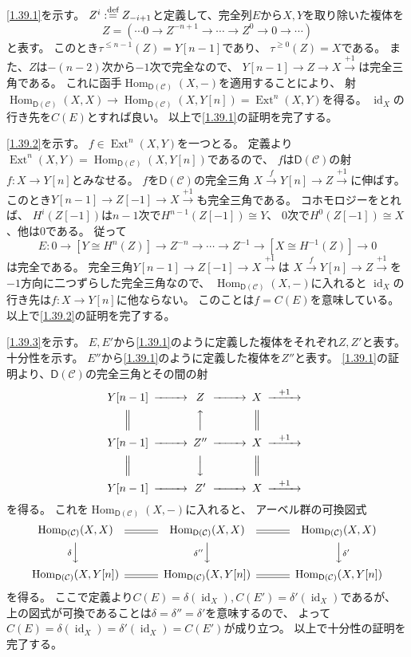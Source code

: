 \documentclass[uplatex,dvipdfmx]{jsarticle}
\makeatletter
\theoremstyle{definition}
\renewenvironment{proof}[1][\proofname]{
  \pushQED{\qed}%
  \normalfont \topsep6\p@\@plus6\p@\relax
  \trivlist
  \item[\hskip\labelsep
    #1\@addpunct{\textbf{.}}]\ignorespaces
}{%
  \popQED\endtrivlist\@endpefalse
}
\providecommand{\proofname}{証明}
\DeclareMathOperator{\Hom}{\mathrm{Hom}}
\DeclareMathOperator{\id}{\mathrm{id}}
\DeclareMathOperator{\Ext}{\mathrm{Ext}}
\newcommand{\sfD}{\mathsf{D}}
\newcommand\mcC{\mathcal{C}}
\def\dfn{:\overset{\mbox{{\scriptsize def}}}{=}}
\makeatother
\begin{document}
\begin{proof}
  \ref{1.39.1}を示す。
  \(Z^i \dfn Z_{-i+1}\)と定義して、完全列\(E\)から\(X,Y\)を取り除いた複体を
  \[Z = (\cdots 0\to Z^{-n+1} \to \cdots \to Z^0\to 0 \to \cdots)\]
  と表す。
  このとき\(\tau^{\leq n-1}(Z) = Y[n-1]\)であり、
  \(\tau^{\geq 0}(Z) = X\)である。
  また、\(Z\)は\(-(n-2)\)次から\(-1\)次で完全なので、
  \(Y[n-1]\to Z\to X\xrightarrow{+1}\)は完全三角である。
  これに函手\(\Hom_{\sfD(\mcC)}(X,-)\)を適用することにより、
  射\(\Hom_{\sfD(\mcC)}(X,X)\to \Hom_{\sfD(\mcC)}(X,Y[n]) = \Ext^n(X,Y)\)を得る。
  \(\id_X\)の行き先を\(C(E)\)とすれば良い。
  以上で\ref{1.39.1}の証明を完了する。

  \ref{1.39.2}を示す。
  \(f\in \Ext^n(X,Y)\)を一つとる。
  定義より\(\Ext^n(X,Y) = \Hom_{\sfD(\mcC)}(X,Y[n])\)であるので、
  \(f\)は\(\sfD(\mcC)\)の射\(f:X\to Y[n]\)とみなせる。
  \(f\)を\(\sfD(\mcC)\)の完全三角
  \(X\xrightarrow{f} Y[n]\to Z\xrightarrow{+1}\)に伸ばす。
  このとき\(Y[n-1]\to Z[-1]\to X\xrightarrow{+1}\)も完全三角である。
  コホモロジーをとれば、
  \(H^i(Z[-1])\)は\(n-1\)次で\(H^{n-1}(Z[-1])\cong Y\)、
  \(0\)次で\(H^0(Z[-1])\cong X\)、他は\(0\)である。
  従って
  \[E : 0\to [Y\cong H^n(Z)]\to Z^{-n} \to \cdots \to Z^{-1} \to [X\cong H^{-1}(Z)]\to 0\]
  は完全である。
  完全三角\(Y[n-1]\to Z[-1]\to X\xrightarrow{+1}\)は
  \(X\xrightarrow{f} Y[n]\to Z\xrightarrow{+1}\)を
  \(-1\)方向に二つずらした完全三角なので、
  \(\Hom_{\sfD(\mcC)}(X,-)\)に入れると
  \(\id_X\)の行き先は\(f:X\to Y[n]\)に他ならない。
  このことは\(f = C(E)\)を意味している。
  以上で\ref{1.39.2}の証明を完了する。

  \ref{1.39.3}を示す。
  \(E,E'\)から\ref{1.39.1}のように定義した複体をそれぞれ\(Z,Z'\)と表す。
  十分性を示す。
  \(E''\)から\ref{1.39.1}のように定義した複体を\(Z''\)と表す。
  \ref{1.39.1}の証明より、\(\sfD(\mcC)\)の完全三角とその間の射
  \[
  \begin{CD}
    Y[n-1] @>>> Z @>>> X @> +1 >> \\
    @| @AAA @| @. \\
    Y[n-1] @>>> Z'' @>>> X @> +1 >> \\
    @| @VVV @| @. \\
    Y[n-1] @>>> Z' @>>> X @> +1 >>
  \end{CD}
  \]
  を得る。
  これを\(\Hom_{\sfD(\mcC)}(X,-)\)に入れると、
  アーベル群の可換図式
  \[
  \begin{CD}
    \Hom_{\sfD(\mcC)}(X,X) @= \Hom_{\sfD(\mcC)}(X,X) @= \Hom_{\sfD(\mcC)}(X,X) \\
    @V \delta VV @V \delta'' VV @VV \delta' V \\
    \Hom_{\sfD(\mcC)}(X,Y[n]) @= \Hom_{\sfD(\mcC)}(X,Y[n]) @= \Hom_{\sfD(\mcC)}(X,Y[n])
  \end{CD}
  \]
  を得る。
  ここで定義より\(C(E) = \delta(\id_X), C(E') = \delta'(\id_X)\)であるが、
  上の図式が可換であることは\(\delta = \delta'' = \delta'\)を意味するので、
  よって\(C(E) = \delta(\id_X) = \delta'(\id_X) = C(E')\)が成り立つ。
  以上で十分性の証明を完了する。


\end{proof}
\end{document}
